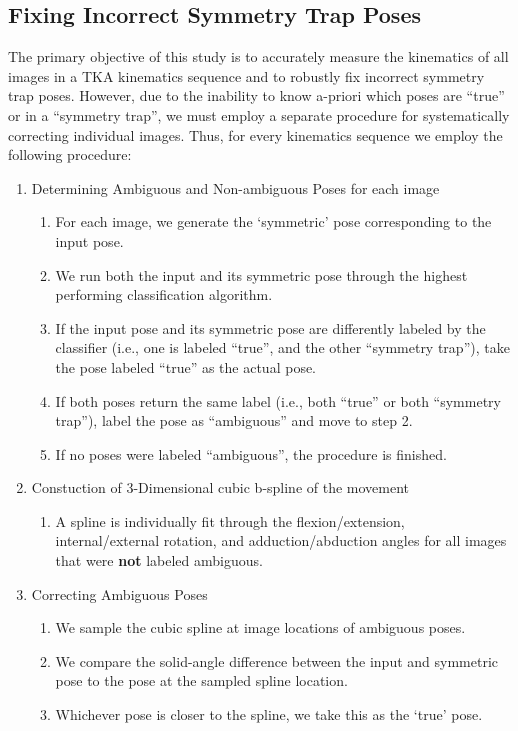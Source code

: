 \subsection{Fixing Incorrect Symmetry Trap Poses}
The primary objective of this study is to accurately measure the kinematics of all images in a TKA kinematics sequence and to robustly fix incorrect symmetry trap poses.
However, due to the inability to know a-priori which poses are “true” or in a “symmetry trap”, we must employ a separate procedure for systematically correcting individual images.
Thus, for every kinematics sequence we employ the following procedure:

\begin{enumerate}
  \item Determining Ambiguous and Non-ambiguous Poses for each image
        \begin{enumerate}
          \item For each image, we generate the `symmetric' pose corresponding to the input pose.
          \item We run both the input and its symmetric pose through the highest performing classification algorithm.
          \item If the input pose and its symmetric pose are differently labeled by the classifier (i.e., one is labeled ``true'', and the other ``symmetry trap''), take the pose labeled ``true'' as the actual pose.
          \item If both poses return the same label (i.e., both ``true'' or both ``symmetry trap''), label the pose as “ambiguous” and move to step 2.
          \item If no poses were labeled “ambiguous”, the procedure is finished.
        \end{enumerate}
  \item Constuction of 3-Dimensional cubic b-spline of the movement
        \begin{enumerate}
          \item A spline is individually fit through the flexion/extension, internal/external rotation, and adduction/abduction angles for all images that were {\bf not} labeled ambiguous.
        \end{enumerate}
  \item Correcting Ambiguous Poses
        \begin{enumerate}
          \item We sample the cubic spline at image locations of ambiguous poses.
          \item We compare the solid-angle difference between the input and symmetric pose to the pose at the sampled spline location.
          \item Whichever pose is closer to the spline, we take this as the `true' pose.
        \end{enumerate}
\end{enumerate}

